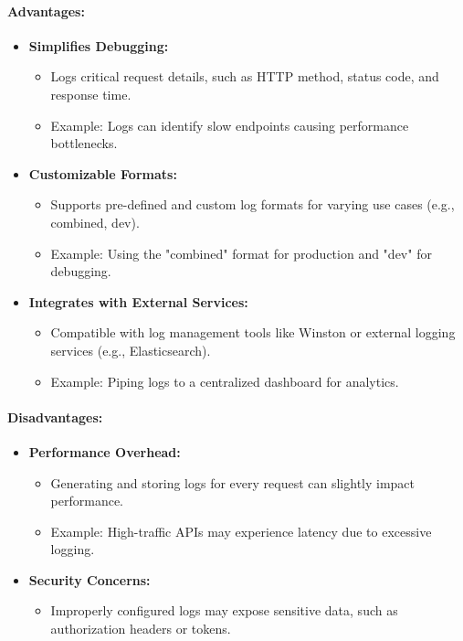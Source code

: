 \paragraph{Advantages:}
\begin{itemize}
    \item \textbf{Simplifies Debugging:}
    \begin{itemize}
        \item Logs critical request details, such as HTTP method, status code, and response time.
        \item Example: Logs can identify slow endpoints causing performance bottlenecks.
    \end{itemize}
    \item \textbf{Customizable Formats:}
    \begin{itemize}
        \item Supports pre-defined and custom log formats for varying use cases (e.g., combined, dev).
        \item Example: Using the "combined" format for production and "dev" for debugging.
    \end{itemize}
    \item \textbf{Integrates with External Services:}
    \begin{itemize}
        \item Compatible with log management tools like Winston or external logging services (e.g., Elasticsearch).
        \item Example: Piping logs to a centralized dashboard for analytics.
    \end{itemize}
\end{itemize}

\paragraph{Disadvantages:}
\begin{itemize}
    \item \textbf{Performance Overhead:}
    \begin{itemize}
        \item Generating and storing logs for every request can slightly impact performance.
        \item Example: High-traffic APIs may experience latency due to excessive logging.
    \end{itemize}
    \item \textbf{Security Concerns:}
    \begin{itemize}
        \item Improperly configured logs may expose sensitive data, such as authorization headers or tokens.
    \end{itemize}
\end{itemize}

